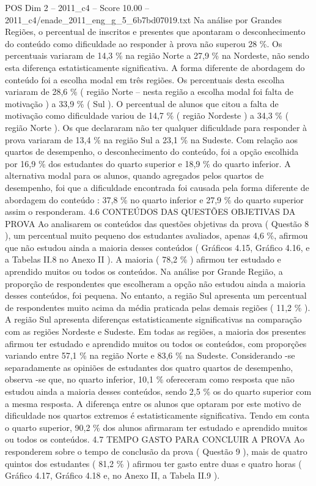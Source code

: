 \begin{textsample}{POS Dim 2 – 2011\_c4 – Score 10.00 – 2011\_c4/enade\_2011\_eng\_g\_5\_6b7bd07019.txt}
Na análise por Grandes Regiões, o percentual de inscritos e presentes que apontaram o desconhecimento do conteúdo como dificuldade ao responder à prova não superou 28 \%.
Os percentuais variaram de 14,3 \% na região Norte a 27,9 \% na Nordeste, não sendo esta diferença estatisticamente significativa.
A forma diferente de abordagem do conteúdo foi a escolha modal em três regiões.
Os percentuais desta escolha variaram de 28,6 \% ( região Norte – nesta região a escolha modal foi falta de motivação ) a 33,9 \% ( Sul ).
O percentual de alunos que citou a falta de motivação como dificuldade variou de 14,7 \% ( região Nordeste ) a 34,3 \% ( região Norte ).
Os que declararam não ter qualquer dificuldade para responder à prova variaram de 13,4 \% na região Sul a 23,1 \% na Sudeste.
Com relação aos quartos de desempenho, o desconhecimento do conteúdo, foi a opção escolhida por 16,9 \% dos estudantes do quarto superior e 18,9 \% do quarto inferior.
A alternativa modal para os alunos, quando agregados pelos quartos de desempenho, foi que a dificuldade encontrada foi causada pela forma diferente de abordagem do conteúdo : 37,8 \% no quarto inferior e 27,9 \% do quarto superior assim o responderam. 4.6 CONTEÚDOS DAS QUESTÕES OBJETIVAS DA PROVA Ao analisarem os conteúdos das questões objetivas da prova ( Questão 8 ), um percentual muito pequeno dos estudantes avaliados, apenas 4,6 \%, afirmou que não estudou ainda a maioria desses conteúdos ( Gráficos 4.15, Gráfico 4.16, e a Tabelas II.8 no Anexo II ).
A maioria ( 78,2 \% ) afirmou ter estudado e aprendido muitos ou todos os conteúdos.
Na análise por Grande Região, a proporção de respondentes que escolheram a opção não estudou ainda a maioria desses conteúdos, foi pequena.
No entanto, a região Sul apresenta um percentual de respondentes muito acima da média praticada pelas demais regiões ( 11,2 \% ).
A região Sul apresenta diferenças estatisticamente significativas na comparação com as regiões Nordeste e Sudeste.
Em todas as regiões, a maioria dos presentes afirmou ter estudado e aprendido muitos ou todos os conteúdos, com proporções variando entre 57,1 \% na região Norte e 83,6 \% na Sudeste.
Considerando -se separadamente as opiniões de estudantes dos quatro quartos de desempenho, observa -se que, no quarto inferior, 10,1 \% ofereceram como resposta que não estudou ainda a maioria desses conteúdos, sendo 2,5 \% os do quarto superior com a mesma resposta.
A diferença entre os alunos que optaram por este motivo de dificuldade nos quartos extremos é estatisticamente significativa.
Tendo em conta o quarto superior, 90,2 \% dos alunos afirmaram ter estudado e aprendido muitos ou todos os conteúdos. 4.7 TEMPO GASTO PARA CONCLUIR A PROVA Ao responderem sobre o tempo de conclusão da prova ( Questão 9 ), mais de quatro quintos dos estudantes ( 81,2 \% ) afirmou ter gasto entre duas e quatro horas ( Gráfico 4.17, Gráfico 4.18 e, no Anexo II, a Tabela II.9 ).

\end{textsample}
